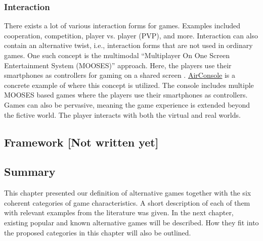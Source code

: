 \documentclass[../Main.tex]{subfiles}
\begin{document}
\subsubsection{Interaction}
There exists a lot of various interaction forms for games. Examples included cooperation, competition, player vs. player (PVP), and more. Interaction can also contain an alternative twist, i.e., interaction forms that are not used in ordinary games. One such concept is the multimodal “Multiplayer On One Screen Entertainment System (MOOSES)” approach. Here, the players use their smartphones as controllers for gaming on a shared screen \citep{wang_evaluation_2010}. \href{http://www.airconsole.com}{AirConsole} is a concrete example of where this concept is utilized. The console includes multiple MOOSES based games where the players use their smartphones as controllers. Games can also be pervasive, meaning the game experience is extended beyond the fictive world. The player interacts with both the virtual and real worlds.

\subsection{Framework [Not written yet]}

\subsection{Summary}
This chapter presented our definition of alternative games together with the six coherent categories of game characteristics. A short description of each of them with relevant examples from the literature was given. In the next chapter, existing popular and known alternative games will be described. How they fit into the proposed categories in this chapter will also be outlined.

\biblio %
\end{document}
